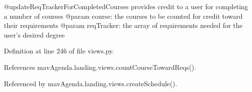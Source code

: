 \begin{DoxyVerb}@updateReqTrackerForCompletedCourses provides credit to a user for completing a number of courses
@param course: the courses to be counted for credit toward their requirements
@param reqTracker: the array of requirements needed for the user's desired degree
\end{DoxyVerb}
 

Definition at line 246 of file views.\+py.



References mav\+Agenda.\+landing.\+views.\+count\+Course\+Toward\+Reqs().



Referenced by mav\+Agenda.\+landing.\+views.\+create\+Schedule().

